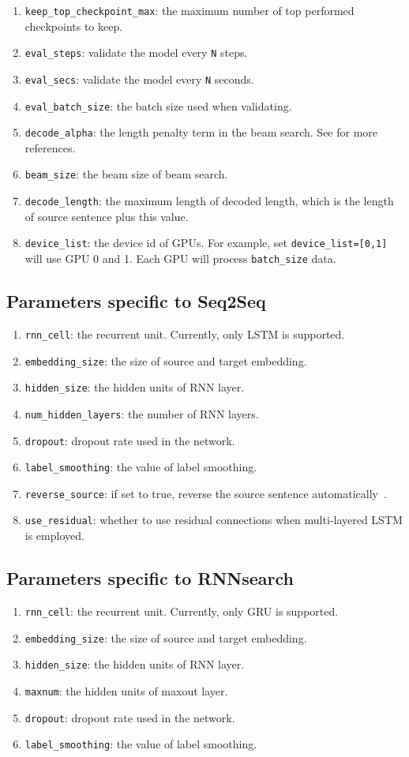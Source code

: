 \documentclass{article}
\begin{document}
\begin{enumerate}
\item \verb|keep_top_checkpoint_max|: the maximum number of top performed checkpoints to keep.
\item \verb|eval_steps|: validate the model every \verb|N| steps.
\item \verb|eval_secs|: validate the model every \verb|N| seconds.
\item \verb|eval_batch_size|: the batch size used when validating.
\item \verb|decode_alpha|: the length penalty term in the beam search. See \citep{Wu:16} for more references.
\item \verb|beam_size|: the beam size of beam search.
\item \verb|decode_length|: the maximum length of decoded length, which is the length of source sentence plus this value.
\item \verb|device_list|: the device id of GPUs. For example, set \verb|device_list=[0,1]| will use GPU 0 and 1. Each GPU will process \verb|batch_size| data.
\end{enumerate}

\subsection{Parameters specific to Seq2Seq}
\begin{enumerate}
\item \verb|rnn_cell|: the recurrent unit. Currently, only LSTM is supported.
\item \verb|embedding_size|: the size of source and target embedding.
\item \verb|hidden_size|: the hidden units of RNN layer.
\item \verb|num_hidden_layers|: the number of RNN layers.
\item \verb|dropout|: dropout rate used in the network.
\item \verb|label_smoothing|: the value of label smoothing.
\item \verb|reverse_source|: if set to true, reverse the source sentence automatically~\citep{Sutskever:14}.
\item \verb|use_residual|: whether to use residual connections when multi-layered LSTM is employed.
\end{enumerate}
\subsection{Parameters specific to RNNsearch}
\begin{enumerate}
\item \verb|rnn_cell|: the recurrent unit. Currently, only GRU is supported.
\item \verb|embedding_size|: the size of source and target embedding.
\item \verb|hidden_size|: the hidden units of RNN layer.
\item \verb|maxnum|: the hidden units of maxout layer.
\item \verb|dropout|: dropout rate used in the network.
\item \verb|label_smoothing|: the value of label smoothing.
\end{enumerate}
\end{document}
